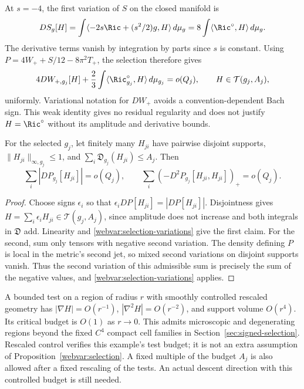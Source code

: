 At $s=-4$, the first variation of $S$ on the closed manifold is
\[
 DS_g[H]=\int\langle-2s\Ric+(s^2/2)g,H\rangle\,d\mu_g
         =8\int\langle\Ric^\circ,H\rangle\,d\mu_g.
\]
The derivative terms vanish by integration by parts since $s$ is constant.
Using $P=4W_++S/12-8\pi^2T_+$, the selection therefore gives
\begin{equation}\label{webvar:weak-equation}
 4DW_{+,g_j}[H]+\frac23\int
       \langle\Ric_{g_j}^\circ,H\rangle\,d\mu_{g_j}=o(Q_j),
       \qquad H\in\mathcal T(g_j,A_j),
\end{equation}
uniformly.  Variational notation for $DW_+$ avoids a convention-dependent
Bach sign.  This weak identity gives no residual regularity and does
not justify $H=\Ric^\circ$ without its amplitude and derivative bounds.

\begin{corollary}\label{webvar:disjoint-regions}
For the selected $g_j$, let finitely many $H_{ji}$ have pairwise disjoint
supports, $\|H_{ji}\|_{\infty,g_j}\le1$, and
$\sum_i\mathfrak D_{g_j}(H_{ji})\le A_j$.  Then
\begin{equation}\label{webvar:disjoint-sums}
 \sum_i|DP_{g_j}[H_{ji}]|=o(Q_j),\qquad
 \sum_i(-D^2P_{g_j}[H_{ji},H_{ji}])_+=o(Q_j).
\end{equation}
\end{corollary}
\begin{proof}
Choose signs $\epsilon_i$ so that
$\epsilon_iDP[H_{ji}]=|DP[H_{ji}]|$.  Disjointness gives
$H=\sum_i\epsilon_iH_{ji}\in\mathcal T(g_j,A_j)$, since amplitude
does not increase and both integrals in $\mathfrak D$ add.
Linearity and \eqref{webvar:selection-variations} give the first claim.
For the second, sum only tensors with negative second variation.
The density defining $P$ is local in the metric's second jet, so
mixed second variations on disjoint supports vanish.  Thus the
second variation of this admissible sum is precisely the sum of
the negative values, and \eqref{webvar:selection-variations} applies.
\end{proof}

A bounded test on a region of radius $r$ with smoothly controlled
rescaled geometry has $|\nabla H|=O(r^{-1})$,
$|\nabla^2H|=O(r^{-2})$, and support volume $O(r^4)$.
Its critical budget is $O(1)$ as $r\to0$.  This admits microscopic
and degenerating regions beyond the fixed $C^4$ compact cell
families in Section~\ref{sec:signed-selection}.  Rescaled control
verifies this example's test budget; it is not an extra assumption
of Proposition~\ref{webvar:selection}.  A fixed multiple of the
budget $A_j$ is also allowed after a fixed rescaling of the tests.
An actual descent direction with this controlled budget is still needed.

